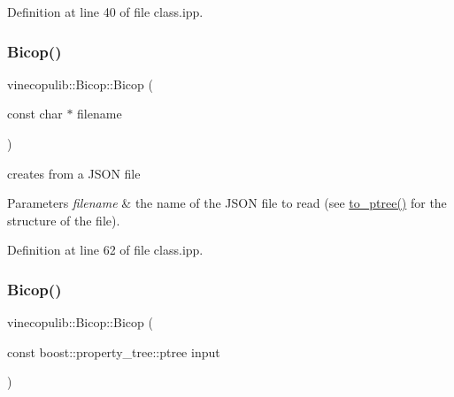 Definition at line 40 of file class.\+ipp.

\mbox{\label{classvinecopulib_1_1_bicop_aebe3a41e3f23817f0234fa789c443a98}} 
\subsubsection{\texorpdfstring{Bicop()}{Bicop()}\hspace{0.1cm}{\footnotesize\ttfamily [3/4]}}
{\footnotesize\ttfamily vinecopulib\+::\+Bicop\+::\+Bicop (\begin{DoxyParamCaption}\item[{const char $\ast$}]{filename }\end{DoxyParamCaption})\hspace{0.3cm}{\ttfamily [inline]}}



creates from a J\+S\+ON file 


\begin{DoxyParams}{Parameters}
{\em filename} & the name of the J\+S\+ON file to read (see \hyperlink{classvinecopulib_1_1_bicop_a74397cf5f843f5aebb436a49322dd2f9}{to\+\_\+ptree()} for the structure of the file). \\
\hline
\end{DoxyParams}


Definition at line 62 of file class.\+ipp.

\mbox{\label{classvinecopulib_1_1_bicop_a48720b451adb23ede4147d4d355f4eaa}} 
\subsubsection{\texorpdfstring{Bicop()}{Bicop()}\hspace{0.1cm}{\footnotesize\ttfamily [4/4]}}
{\footnotesize\ttfamily vinecopulib\+::\+Bicop\+::\+Bicop (\begin{DoxyParamCaption}\item[{const boost\+::property\+\_\+tree\+::ptree}]{input }\end{DoxyParamCaption})\hspace{0.3cm}{\ttfamily [inline]}}



